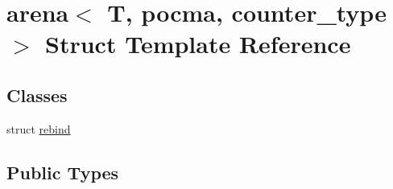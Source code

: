 \hypertarget{structarena}{}\section{arena$<$ T, pocma, counter\+\_\+type $>$ Struct Template Reference}
\label{structarena}
\subsection*{Classes}
\begin{DoxyCompactItemize}
\item 
struct \hyperlink{structarena_1_1rebind}{rebind}
\end{DoxyCompactItemize}
\subsection*{Public Types}
